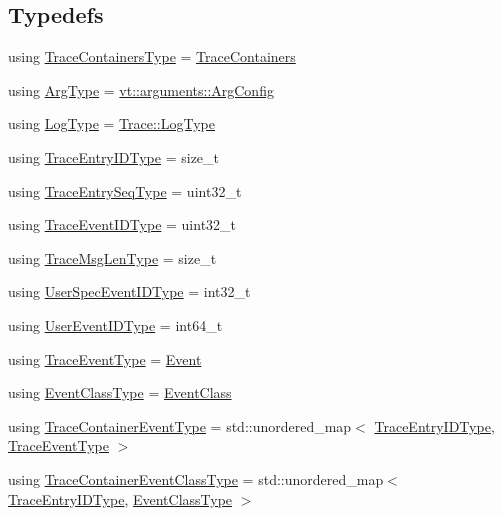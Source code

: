\subsection*{Typedefs}
\begin{DoxyCompactItemize}
\item 
using \hyperlink{namespacevt_1_1trace_a526573625774f28d49baddd61b9c701c}{Trace\+Containers\+Type} = \hyperlink{classvt_1_1trace_1_1_trace_containers}{Trace\+Containers}
\item 
using \hyperlink{namespacevt_1_1trace_ac55854009908dbec57de1f2f974c36e8}{Arg\+Type} = \hyperlink{structvt_1_1arguments_1_1_arg_config}{vt\+::arguments\+::\+Arg\+Config}
\item 
using \hyperlink{namespacevt_1_1trace_abf816ddd3c20f0f8d974662f373b088d}{Log\+Type} = \hyperlink{structvt_1_1trace_1_1_trace_a43306d96a91e49db081eaea016f1dd0a}{Trace\+::\+Log\+Type}
\item 
using \hyperlink{namespacevt_1_1trace_a3c14050715ba9eceaeff51fb3de64f2f}{Trace\+Entry\+I\+D\+Type} = size\+\_\+t
\item 
using \hyperlink{namespacevt_1_1trace_a522028dd2a7d056f0ec3d417836fdecd}{Trace\+Entry\+Seq\+Type} = uint32\+\_\+t
\item 
using \hyperlink{namespacevt_1_1trace_a64a7185f3e102df8d8258f263ccd1582}{Trace\+Event\+I\+D\+Type} = uint32\+\_\+t
\item 
using \hyperlink{namespacevt_1_1trace_aeb598f45d67d41db7902e494f2f0ce59}{Trace\+Msg\+Len\+Type} = size\+\_\+t
\item 
using \hyperlink{namespacevt_1_1trace_a70c43e0e1596eea236912d4197d3120a}{User\+Spec\+Event\+I\+D\+Type} = int32\+\_\+t
\item 
using \hyperlink{namespacevt_1_1trace_a5908920d051c144c89f17c69ed262350}{User\+Event\+I\+D\+Type} = int64\+\_\+t
\item 
using \hyperlink{namespacevt_1_1trace_a79b7fa947245c08d04a3ea67fbff2c30}{Trace\+Event\+Type} = \hyperlink{structvt_1_1trace_1_1_event}{Event}
\item 
using \hyperlink{namespacevt_1_1trace_afc5456ac95b0d3e9bb63a21597f5660c}{Event\+Class\+Type} = \hyperlink{structvt_1_1trace_1_1_event_class}{Event\+Class}
\item 
using \hyperlink{namespacevt_1_1trace_a80118aaa48fed940af3899800bba2303}{Trace\+Container\+Event\+Type} = std\+::unordered\+\_\+map$<$ \hyperlink{namespacevt_1_1trace_a3c14050715ba9eceaeff51fb3de64f2f}{Trace\+Entry\+I\+D\+Type}, \hyperlink{namespacevt_1_1trace_a79b7fa947245c08d04a3ea67fbff2c30}{Trace\+Event\+Type} $>$
\item 
using \hyperlink{namespacevt_1_1trace_a352c8799ee88afa3f1b7008952ed8485}{Trace\+Container\+Event\+Class\+Type} = std\+::unordered\+\_\+map$<$ \hyperlink{namespacevt_1_1trace_a3c14050715ba9eceaeff51fb3de64f2f}{Trace\+Entry\+I\+D\+Type}, \hyperlink{namespacevt_1_1trace_afc5456ac95b0d3e9bb63a21597f5660c}{Event\+Class\+Type} $>$
\end{DoxyCompactItemize}
